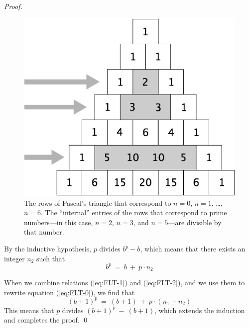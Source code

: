 \begin{proof}
\begin{figure}[ht]
\begin{center}
  \includegraphics[scale=0.3]{FiguresArithmetic/TrianglePascalPrimes.png}
\caption{The rows of Pascal's triangle that correspond to $n=0$,
  $n=1$, \ldots, $n=6$.  The ``internal'' entries of the rows that
  correspond to prime numbers---in this case, $n=2$, $n=3$, and $n=5$---are
  divisible by that number.}
\label{fig:TrianglePrime}
\end{center}
\end{figure}

By the inductive hypothesis, $p$ divides $b^p -b$, which means that
there exists an integer $n_2$ such that
\begin{equation}
\label{eq:FLT-2}
 b^p \ = \ b \ + \ p \cdot n_2
\end{equation}

\smallskip

When we combine relations (\ref{eq:FLT-1}) and (\ref{eq:FLT-2}), and
we use them to rewrite equation (\ref{eq:FLT-0}), we find that
\[
(b+1)^p \ = \ (b + 1) \ + \ p \cdot (n_1 + n_2)
\]
This means that $p$ divides $(b+1)^p \ - \ (b + 1)$, which extends the
induction and completes the proof.
\qed
\end{proof}

